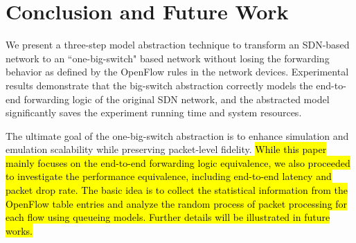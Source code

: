 \section{Conclusion and Future Work}
\label{Sec:conclusion}

We present a three-step model abstraction technique to transform an SDN-based network to
an ``one-big-switch" based network without losing the forwarding behavior as
defined by the OpenFlow rules in the network devices.
Experimental results demonstrate that the big-switch abstraction correctly models
the end-to-end forwarding logic of the original SDN network,
and the abstracted model significantly saves the experiment running time and system resources.

The ultimate goal of the one-big-switch abstraction is to enhance simulation and emulation scalability while preserving packet-level fidelity.
\hl{
While this paper mainly focuses on the end-to-end forwarding logic equivalence,
we also proceeded to investigate the performance equivalence,
including end-to-end latency and packet drop rate.
The basic idea is to collect the statistical information from the OpenFlow table entries
and analyze the random process of packet processing for each flow using queueing models.
Further details will be illustrated in future works.
}
